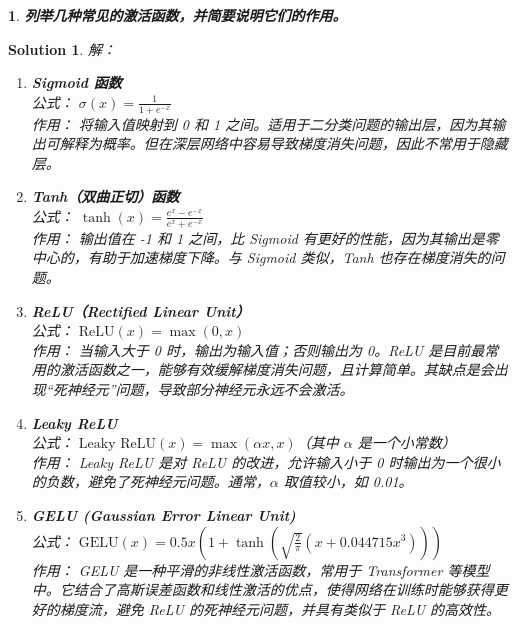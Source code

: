 \documentclass{article}
\title{\Huge\Assignment}
\author{\ID \Name \quad\href{mailto:tianym2022@smail.nju.edu.cn}{\color{magenta}\Email}}
\date{\today}
\theoremstyle{Problem}
\newtheorem{prob}{}
\theoremstyle{Solution}
\newtheorem*{sol}{Solution}
\begin{document}
	\maketitle
	
	\begin{prob}
		\textbf{列举几种常见的激活函数，并简要说明它们的作用。}
	\end{prob}
	
	\begin{sol}
	解：
\begin{enumerate}
	\item \textbf{Sigmoid 函数} \\
	\textit{公式：} \( \sigma(x) = \frac{1}{1 + e^{-x}} \) \\
	\textit{作用：} 将输入值映射到 0 和 1 之间。适用于二分类问题的输出层，因为其输出可解释为概率。但在深层网络中容易导致梯度消失问题，因此不常用于隐藏层。
	
	\item \textbf{Tanh（双曲正切）函数} \\
	\textit{公式：} \( \tanh(x) = \frac{e^{x} - e^{-x}}{e^{x} + e^{-x}} \) \\
	\textit{作用：} 输出值在 -1 和 1 之间，比 Sigmoid 有更好的性能，因为其输出是零中心的，有助于加速梯度下降。与 Sigmoid 类似，Tanh 也存在梯度消失的问题。
	
	\item \textbf{ReLU（Rectified Linear Unit）} \\
	\textit{公式：} \( \text{ReLU}(x) = \max(0, x) \) \\
	\textit{作用：} 当输入大于 0 时，输出为输入值；否则输出为 0。ReLU 是目前最常用的激活函数之一，能够有效缓解梯度消失问题，且计算简单。其缺点是会出现“死神经元”问题，导致部分神经元永远不会激活。
	
	\item \textbf{Leaky ReLU} \\
	\textit{公式：} \( \text{Leaky ReLU}(x) = \max(\alpha x, x) \)（其中 \(\alpha\) 是一个小常数） \\
	\textit{作用：} Leaky ReLU 是对 ReLU 的改进，允许输入小于 0 时输出为一个很小的负数，避免了死神经元问题。通常，\(\alpha\) 取值较小，如 0.01。
	
	\item \textbf{GELU (Gaussian Error Linear Unit)} \\
	\textit{公式：} \( \text{GELU}(x) = 0.5 x \left( 1 + \tanh\left( \sqrt{\frac{2}{\pi}} (x + 0.044715 x^3) \right) \right) \) \\
	\textit{作用：} GELU 是一种平滑的非线性激活函数，常用于 Transformer 等模型中。它结合了高斯误差函数和线性激活的优点，使得网络在训练时能够获得更好的梯度流，避免 ReLU 的死神经元问题，并具有类似于 ReLU 的高效性。
\end{enumerate}
	\end{sol}
	
\end{document}
